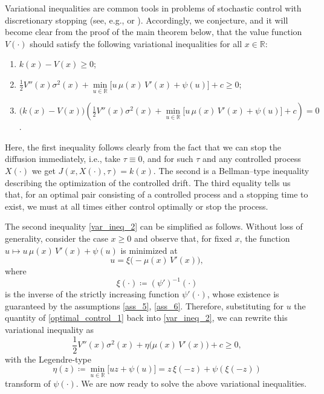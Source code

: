 \documentclass[11pt,tbtags,reqno]{article}
\theoremstyle{definition}
\numberwithin{equation}{section}
\theoremstyle{definition}
\begin{document}
Variational inequalities are common tools in problems of stochastic control with discretionary stopping (see, e.g., \cite{DavZer} or \cite{KarOcoWanZer}). Accordingly, we conjecture, and it will become clear from the proof of the main theorem below, that the value function $V(\cdot)$ should satisfy the following variational inequalities for all $x \in \mathbb{R}$:
\begin{enumerate}[label = \textbf{(\roman*)}]
    \item $k(x) - V(x) \ge 0$; \label{var_ineq_1}
    \item $\frac{1}{2}V''(x)\sigma^2(x) + \min\limits_{u \in \mathbb{R}}\Big[ u \,\mu(x)\, V'(x) + \psi(u) \Big] + c \ge 0$; \label{var_ineq_2}
    \item $\Big( k(x) - V(x)\Big)\left( \frac{1}{2}V''(x)\sigma^2(x) + \min\limits_{u \in \mathbb{R}}\Big[ u \,\mu(x)\, V'(x) + \psi(u) \Big] + c
    \right) = 0$. \label{var_ineq_3}
\end{enumerate}
Here, the first inequality follows clearly from the fact that we can stop the diffusion immediately, i.e., take $\tau \equiv 0$, and for such $\tau$ and any controlled process $X(\cdot)$ we get $J(x, X(\cdot), \tau) = k(x)$. The second is a Bellman--type inequality describing the optimization of the controlled drift. The third equality tells us that, for an optimal pair consisting of a controlled process and a stopping time to exist, we must at all times either control optimally or stop the process. 

The second inequality \ref{var_ineq_2} can be simplified as follows. Without loss of generality, consider the case $x \ge 0$ and observe that, for fixed $x$, the function $u \mapsto u \,\mu(x)\, V'(x) + \psi(u)$ is minimized at 
\begin{equation}\label{optimal_control_1}
    u = \xi\big(-\mu(x) \, V'(x)\big),
\end{equation}
where 
\begin{equation}\label{def_inversi_psi_prime}
    \xi(\cdot) \coloneqq \left(\psi'\right)^{-1}(\cdot)
\end{equation}
is the inverse of the strictly increasing function $\psi'(\cdot)$, whose existence is guaranteed by the assumptions \ref{ass_5}, \ref{ass_6}. Therefore, substituting for $u$ the quantity of \eqref{optimal_control_1} back into \ref{var_ineq_2}, we can rewrite this variational inequality as
\begin{equation}\label{variational_inequality_with_lambda}
     \frac{1}{2}V''(x)\sigma^2(x) + \eta\big(\mu(x) \, V'(x)\big) + c \ge 0,
\end{equation}
with the Legendre-type
\begin{equation}\label{eta_function}
    \eta(z) \coloneqq \min\limits_{u \in \mathbb{R}}\Big[ uz + \psi(u) \Big] = z \, \xi(-z) + \psi(\xi(-z))
\end{equation}
transform of $\psi(\cdot)$. We are now ready to solve the above variational inequalities. 
\end{document}
